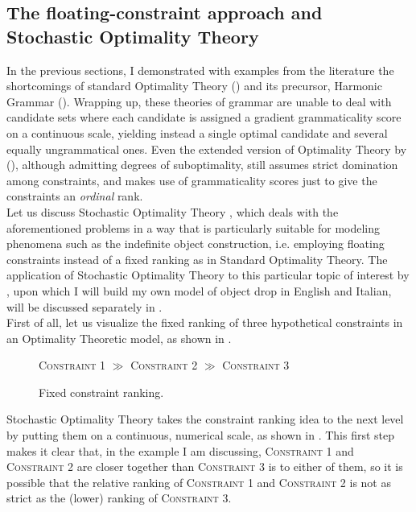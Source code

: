 \subsection{The floating-constraint approach and Stochastic Optimality Theory}  %

In the previous sections, I demonstrated with examples from the literature the shortcomings of standard Optimality Theory () and its precursor, Harmonic Grammar (). Wrapping up, these theories of grammar are unable to deal with candidate sets where each candidate is assigned a gradient grammaticality score on a continuous scale, yielding instead a single optimal candidate and several equally ungrammatical ones. Even the extended version of Optimality Theory by \textcite{keller1997extraction} (), although admitting degrees of suboptimality, still assumes strict domination among constraints, and makes use of grammaticality scores just to give the constraints an \textit{ordinal} rank.\\
Let us discuss Stochastic Optimality Theory \parencite{BoersmaHayes2001empirical, boersma1997we}, which deals with the aforementioned problems in a way that is particularly suitable for modeling phenomena such as the indefinite object construction, i.e. employing floating constraints instead of a fixed ranking as in Standard Optimality Theory. The application of Stochastic Optimality Theory to this particular topic of interest by \textcite{Medina2007}, upon which I will build my own model of object drop in English and Italian, will be discussed separately in .\\
First of all, let us visualize the fixed ranking of three hypothetical constraints in an Optimality Theoretic model, as shown in . 

\begin{figure}[htb]
\caption{Fixed constraint ranking.}
\textsc{Constraint 1} $\gg$ \textsc{Constraint 2} $\gg$ \textsc{Constraint 3}
\end{figure}

Stochastic Optimality Theory takes the constraint ranking idea to the next level by putting them on a continuous, numerical scale, as shown in . This first step makes it clear that, in the example I am discussing, \textsc{Constraint 1} and \textsc{Constraint 2} are closer together than \textsc{Constraint 3} is to either of them, so it is possible that the relative ranking of \textsc{Constraint 1} and \textsc{Constraint 2} is not as strict as the (lower) ranking of \textsc{Constraint 3}.

